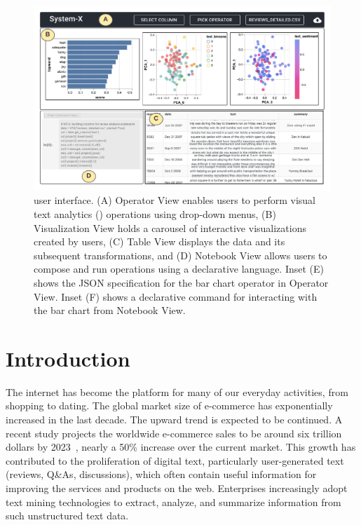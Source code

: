  
\begin{figure}[tbp] 
  \centering
  \includegraphics[width=\linewidth]{figures/leam_fe.pdf}
  \caption{\small \system user interface. (A) Operator View enables users to perform visual text analytics (\vita) operations using drop-down menus, (B) Visualization View 
  holds a carousel of interactive visualizations created by users, (C) Table View displays the data and its subsequent transformations, and (D) Notebook View allows users to compose and run \vita operations using a declarative language. Inset (E) shows the \vta JSON specification for the bar chart operator in Operator View. Inset (F) shows a declarative \vta command for interacting with the bar chart from Notebook View. \label{fig:fe}} 
\end{figure}

\section{Introduction}\label{sec:intro}
The internet has become the platform for many of our everyday activities, from shopping to dating. The global market size of e-commerce has exponentially increased in the last decade. 
The upward trend is expected to be continued.  A recent study projects the worldwide e-commerce sales to be around six trillion dollars by 2023~\cite{ecommerce}, nearly a 50\% increase over the current market. This growth has contributed to the proliferation of digital text, particularly user-generated text (reviews, Q\&As, discussions), which often contain useful information for improving the services and products on the web. Enterprises increasingly adopt text mining technologies to extract, analyze, and summarize information from such unstructured text data.

